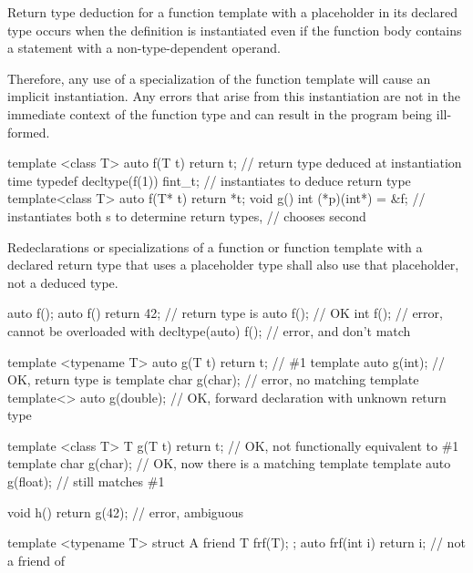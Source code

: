 \pnum
Return type deduction for a function template with a placeholder in its
declared type occurs when the definition is instantiated even if the function
body contains a  statement with a non-type-dependent operand.
\begin{note} Therefore, any use of a specialization of the function template will
cause an implicit instantiation. Any errors that arise from this instantiation
are not in the immediate context of the function type and can result in the
program being ill-formed. \end{note}
\begin{example}
\begin{codeblock}
template <class T> auto f(T t) { return t; }  // return type deduced at instantiation time
typedef decltype(f(1)) fint_t;                // instantiates  to deduce return type
template<class T> auto f(T* t) { return *t; }
void g() { int (*p)(int*) = &f; }             // instantiates both s to determine return types,
                                              // chooses second
\end{codeblock}
\end{example}

\pnum
Redeclarations or specializations of a function or function template with a
declared return type that uses a placeholder type shall also use that
placeholder, not a deduced type.
\begin{example}
\begin{codeblock}
auto f();
auto f() { return 42; } // return type is 
auto f();               // OK
int f();                // error, cannot be overloaded with 
decltype(auto) f();     // error,  and  don't match

template <typename T> auto g(T t) { return t; } // \#1
template auto g(int);                           // OK, return type is 
template char g(char);                          // error, no matching template
template<> auto g(double);                      // OK, forward declaration with unknown return type

template <class T> T g(T t) { return t; } // OK, not functionally equivalent to \#1
template char g(char);                    // OK, now there is a matching template
template auto g(float);                   // still matches \#1

void h() { return g(42); } // error, ambiguous

template <typename T> struct A {
  friend T frf(T);
};
auto frf(int i) { return i; } // not a friend of 
\end{codeblock}
\end{example}


